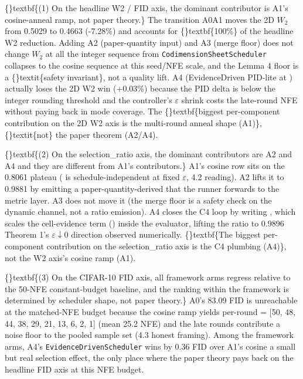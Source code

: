 \documentclass{article}
\begin{document}
\{\}textbf\{(1) On the headline W2 / FID axis, the dominant contributor is A1's cosine-anneal ramp, not paper theory.\} The transition A0A1 moves the 2D $W_2$ from 0.5029 to 0.4663 (-7.28\%) and accounts for \{\}textbf\{100\%\} of the headline W2 reduction. Adding A2 (paper-quantity input) and A3 (merge floor) does not change $W_2$ at all  the integer  sequence from \texttt{CodimensionSheetScheduler} collapses to the cosine sequence at this seed/NFE scale, and the Lemma 4 floor is a \{\}textit\{safety invariant\}, not a quality lift. A4 (EvidenceDriven PID-lite at ) actually loses the 2D W2 win (+0.03\%) because the PID delta is below the integer rounding threshold and the controller's $\varepsilon$ shrink costs the late-round NFE without paying back in mode coverage. The \{\}textbf\{biggest per-component contribution on the 2D W2 axis is the multi-round anneal shape (A1)\}, \{\}textit\{not\} the paper theorem (A2/A4).

\{\}textbf\{(2) On the selection\_ratio axis, the dominant contributors are A2 and A4  and they are different from A1's contributors.\} A1's cosine row sits on the 0.8061 plateau ( is schedule-independent at fixed $\varepsilon$, 4.2 reading). A2 lifts it to 0.9881 by emitting a paper-quantity-derived  that the runner forwards to the metric layer. A3 does not move it (the merge floor is a safety check on the dynamic channel, not a ratio emission). A4 closes the C4 loop by writing , which scales the cell-evidence term () inside the evaluator, lifting the ratio to 0.9896  Theorem 1's $\varepsilon \downarrow 0$ direction observed numerically. \{\}textbf\{The biggest per-component contribution on the selection\_ratio axis is the C4 plumbing (A4)\}, not the W2 axis's cosine ramp (A1).

\{\}textbf\{(3) On the CIFAR-10 FID axis, all framework arms regress relative to the 50-NFE constant-budget baseline, and the ranking within the framework is determined by scheduler shape, not paper theory.\} A0's 83.09 FID is unreachable at the matched-NFE budget because the cosine ramp yields per-round  = [50, 48, 44, 38, 29, 21, 13, 6, 2, 1] (mean 25.2 NFE) and the late rounds contribute a noise floor to the pooled sample set (4.3 honest framing). Among the framework arms, A4's \texttt{EvidenceDrivenScheduler} wins by 0.36 FID over A1's cosine  a small but real selection effect, the only place where the paper theory pays back on the headline FID axis at this NFE budget.
\end{document}
